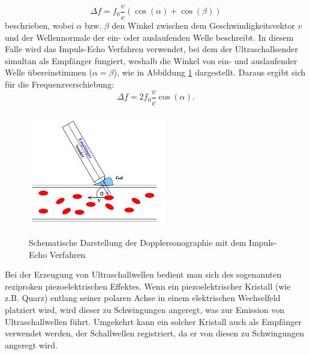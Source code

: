\begin{equation}
\Delta f=f_0\frac{v}{c}(\cos(\alpha)+\cos(\beta))
\end{equation}
beschrieben, wobei $\alpha$ bzw. $\beta$ den Winkel zwischen dem Geschwindigkeitsvektor $v$ und der Wellennormale der ein- oder auslaufenden Welle beschreibt. In diesem Falle wird das Impuls-Echo Verfahren verwendet, bei dem der Ultraschallsender simultan als Empfänger fungiert, weshalb die Winkel von ein- und auslaufender Welle übereinstimmen ($\alpha=\beta$), wie in Abbildung \ref{fig:Dopplersonographie} dargestellt. Daraus ergibt sich für die Frequenzverschiebung:
\begin{equation}
\Delta f=2f_0 \frac{v}{c}\cos(\alpha).
\end{equation} 
\begin{figure} [h]
    \centering
    \includegraphics[width=6cm, keepaspectratio]{Dopplersonographie Skizze}
    \label{fig:Dopplersonographie}
    \caption{Schematische Darstellung der Dopplersonographie mit dem Impuls-Echo Verfahren}
 \end{figure} 
Bei der Erzeugung von Ultraschallwellen bedient man sich des sogenannten reziproken piezoelektrischen Effektes. Wenn ein piezoelektrischer Kristall (wie z.B. Quarz) entlang seiner polaren Achse in einem elektrischen Wechselfeld platziert wird, wird dieser zu Schwingungen angeregt, was zur Emission von Ultraschallwellen führt. Umgekehrt kann ein solcher Kristall auch als Empfänger verwendet werden, der Schallwellen registriert, da er von diesen zu Schwingungen angeregt wird. \\
